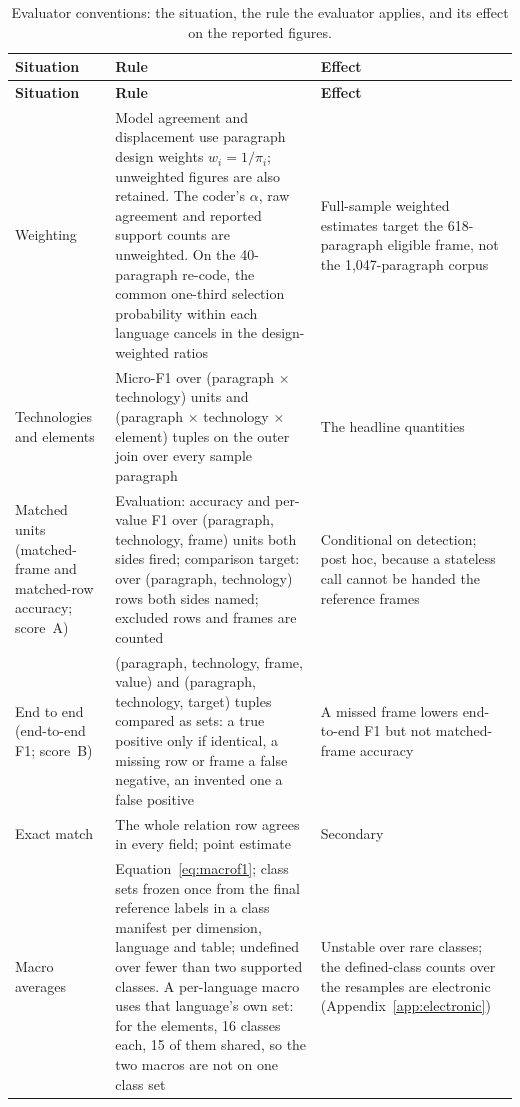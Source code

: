 \begingroup\scriptsize
\setlength{\tabcolsep}{4pt}
\begin{longtable}{@{}>{\raggedright\arraybackslash}p{27mm}>{\raggedright\arraybackslash}p{80mm}>{\raggedright\arraybackslash}p{45mm}@{}}
\caption[Evaluator conventions]{Evaluator conventions: the situation, the rule the evaluator applies, and its effect on the reported figures.}\label{tab:conventions} \\
\toprule
\textbf{Situation} & \textbf{Rule} & \textbf{Effect} \\
\midrule
\endfirsthead
\toprule
\textbf{Situation} & \textbf{Rule} & \textbf{Effect} \\
\midrule
\endhead
\bottomrule
\endfoot
Weighting & Model agreement and displacement use paragraph design weights $w_i = 1/\pi_i$; unweighted figures are also retained. The coder's $\alpha$, raw agreement and reported support counts are unweighted. On the 40-paragraph re-code, the common one-third selection probability within each language cancels in the design-weighted ratios & Full-sample weighted estimates target the 618-paragraph eligible frame, not the 1{,}047-paragraph corpus \\
Technologies and elements & Micro-F1 over (paragraph $\times$ technology) units and (paragraph $\times$ technology $\times$ element) tuples on the outer join over every sample paragraph & The headline quantities \\
Matched units (matched-frame and matched-row accuracy; score~A) & Evaluation: accuracy and per-value F1 over (paragraph, technology, frame) units both sides fired; comparison target: over (paragraph, technology) rows both sides named; excluded rows and frames are counted & Conditional on detection; post hoc, because a stateless call cannot be handed the reference frames \\
End to end (end-to-end F1; score~B) & (paragraph, technology, frame, value) and (paragraph, technology, target) tuples compared as sets: a true positive only if identical, a missing row or frame a false negative, an invented one a false positive & A missed frame lowers end-to-end F1 but not matched-frame accuracy \\
Exact match & The whole relation row agrees in every field; point estimate & Secondary \\
Macro averages & Equation~\eqref{eq:macrof1}; class sets frozen once from the final reference labels in a class manifest per dimension, language and table; undefined over fewer than two supported classes. A per-language macro uses that language's own set: for the elements, 16 classes each, 15 of them shared, so the two macros are not on one class set & Unstable over rare classes; the defined-class counts over the resamples are electronic (Appendix~\ref{app:electronic}) \\

\end{longtable}
